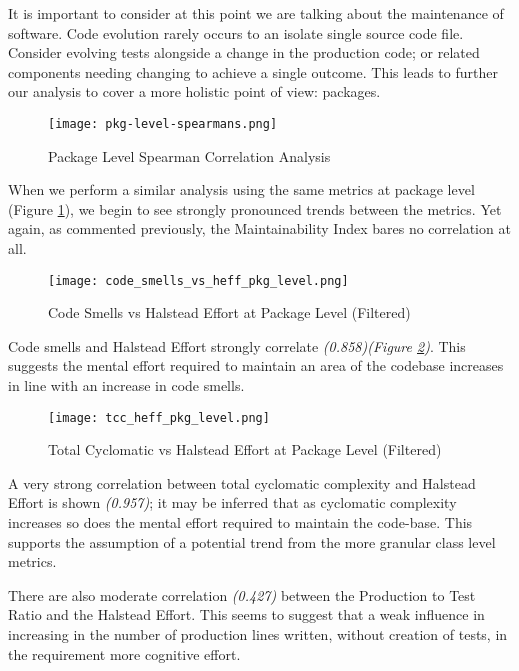 It is important to consider at this point we are talking about the maintenance of software. Code evolution rarely occurs to an isolate single source code file. Consider evolving tests alongside a change in the production code; or related components needing changing to achieve a single outcome. This leads to further our analysis to cover a more holistic point of view: packages.


\begin{figure}[H]
	\texttt{[image: pkg-level-spearmans.png]}
	\caption{Package Level Spearman Correlation Analysis}
	\label{fig:pkgLevelSpearmans}  
\end{figure}

When we perform a similar analysis using the same metrics at package level (Figure \ref{fig:pkgLevelSpearmans}), we begin to see strongly pronounced trends between the metrics.  Yet again, as commented previously, the Maintainability Index bares no correlation at all.

\begin{figure}[H]
	\texttt{[image: code\_smells\_vs\_heff\_pkg\_level.png]}
	\caption{Code Smells vs Halstead Effort at Package Level (Filtered)}
	\label{fig:codeSmellsHeffPkg}  
\end{figure}

Code smells and Halstead Effort strongly correlate \textit{(0.858)(Figure \ref{fig:codeSmellsHeffPkg})}. This suggests the mental effort required to maintain an area of the codebase increases in line with an increase in code smells. 

\begin{figure}[H]
	\texttt{[image: tcc\_heff\_pkg\_level.png]}
	\caption{Total Cyclomatic vs Halstead Effort at Package Level (Filtered)}
	\label{fig:tccHeffPkg}  
\end{figure}

A very strong correlation between total cyclomatic complexity and Halstead Effort is shown \textit{(0.957)}; it may be inferred that as cyclomatic complexity increases so does the mental effort required to maintain the code-base. This supports the assumption of a potential trend from the more granular class level metrics.

There are also moderate correlation \textit{(0.427)} between the Production to Test Ratio and the Halstead Effort. This seems to suggest that a weak influence in increasing in the number of production lines written, without creation of tests, in the requirement more cognitive effort.

